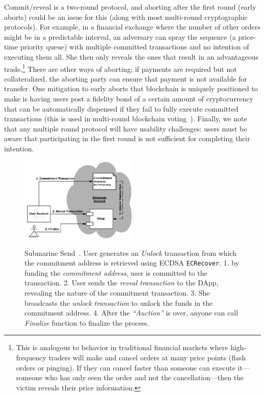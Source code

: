 Commit/reveal is a two-round protocol, and aborting after the first round (early aborts) could be an issue for this (along with most multi-round cryptographic protocols). For example, in a financial exchange where the number of other orders might be in a predictable interval, an adversary can spray the sequence (\ie a price-time priority queue) with multiple committed transactions and no intention of executing them all. She then only reveals the ones that result in an advantageous trade.\footnote{This is analogous to behavior in traditional financial markets where high-frequency traders will make and cancel orders at many price points (flash orders or pinging). If they can cancel faster than someone can execute it---someone who has only seen the order and not the cancellation---then the victim reveals their price information.} There are other ways of aborting; if payments are required but not collateralized, the aborting party can ensure that payment is not available for transfer. One mitigation to early aborts that blockchain is uniquely positioned to make is having users post a fidelity bond of a certain amount of cryptocurrency that can be automatically dispensed if they fail to fully execute committed transactions (this is used in multi-round blockchain voting~\cite{mccorry2017smart}). Finally, we note that any multiple round protocol will have usability challenges: users must be aware that participating in the first round is not sufficient for completing their intention.


\begin{figure}[t]
    \centering
{\includegraphics[width=0.5\textwidth]{figures/LibSubmarine.png}}
{\caption[Submarine Send]{Submarine Send~\cite{libsubmarine}. User generates an \textit{Unlock} transaction from which the commitment address is retrieved using ECDSA \texttt{ECRecover}. \textsf{1.} by funding the \textit{commitment address}, user is committed to the transaction. \textsf{2.} User sends the \textit{reveal transaction} to the DApp, revealing the nature of the commitment transaction. \textsf{3.} She broadcasts the \textit{unlock transaction} to unlock the funds in the commitment address. \textsf{4.} After the \textit{``Auction''} is over, anyone can call \textit{Finalize} function to finalize the process.}\label{fig:LibSubmarine}}
\end{figure}


